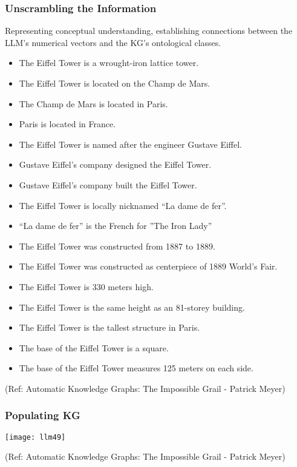 \begin{frame}[fragile]\frametitle{Unscrambling the Information}

Representing conceptual understanding, establishing connections between the LLM's numerical vectors and the KG's ontological classes.

\begin{itemize}
\item The Eiffel Tower is a wrought-iron lattice tower.
\item The Eiffel Tower is located on the Champ de Mars.
\item The Champ de Mars is located in Paris.
\item Paris is located in France.
\item The Eiffel Tower is named after the engineer Gustave Eiffel.
\item Gustave Eiffel’s company designed the Eiffel Tower.
\item Gustave Eiffel’s company built the Eiffel Tower.
\item The Eiffel Tower is locally nicknamed “La dame de fer”.
\item “La dame de fer” is the French for ”The Iron Lady”
\item The Eiffel Tower was constructed from 1887 to 1889.
\item The Eiffel Tower was constructed as centerpiece of 1889 World’s Fair.
\item The Eiffel Tower is 330 meters high.
\item The Eiffel Tower is the same height as an 81-storey building.
\item The Eiffel Tower is the tallest structure in Paris.
\item The base of the Eiffel Tower is a square.
\item The base of the Eiffel Tower measures 125 meters on each side.
\end{itemize}

{\tiny (Ref: Automatic Knowledge Graphs: The Impossible Grail - Patrick Meyer)}

\end{frame}

\begin{frame}[fragile]\frametitle{Populating KG}

\begin{center}
\texttt{[image: llm49]}
\end{center}

{\tiny (Ref: Automatic Knowledge Graphs: The Impossible Grail - Patrick Meyer)}

\end{frame}

